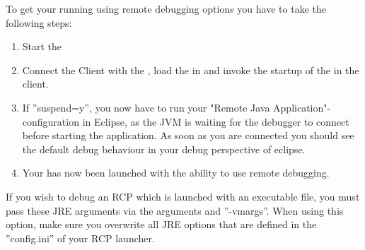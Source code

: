 To get your \gdaut{} running using remote debugging options you have to take the following steps:
\begin{enumerate}
 \item Start the \gdagent{}
 \item Connect the Client with the \gdagent{}, load the \gdproject{} in \app{} and invoke the startup of the \gdaut{} in the \app{}  client.
 \item If ''suspend=y'', you now have to run your "Remote Java Application"-configuration 
 in Eclipse, as the JVM is waiting for the debugger to connect before starting the 
 application. As soon as you are connected you should see the default debug behaviour in your
 debug perspective of eclipse.
 \item Your \gdaut{} has now been launched with the ability to use remote debugging.  
\end{enumerate}

If you wish to debug an RCP \gdaut{}  which is launched with an 
executable file, you must pass these JRE arguments via the \gdaut{} arguments and ''-vmargs''. When using this option, make sure you overwrite all JRE options that are defined in the ''config.ini'' of your RCP launcher.
